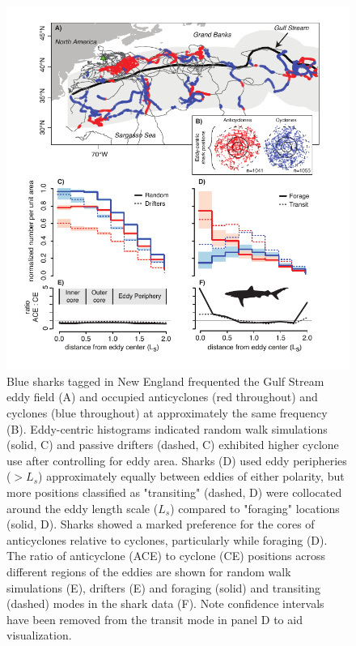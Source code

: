 \begin{figure}[htbp]
\centering
\includegraphics{images/C5_Fig1.pdf}
\caption[Use of Gulf Stream eddies by satellite-tagged blue sharks]{Blue sharks tagged in New England frequented the Gulf Stream eddy field (A) and occupied anticyclones (red throughout) and cyclones (blue throughout) at approximately the same frequency (B). Eddy-centric histograms indicated random walk simulations (solid, C) and passive drifters (dashed, C) exhibited higher cyclone use after controlling for eddy area. Sharks (D) used eddy peripheries ($>L_s$) approximately equally between eddies of either polarity, but more positions classified as "transiting" (dashed, D) were collocated around the eddy length scale ($L_s$) compared to "foraging" locations (solid, D). Sharks showed a marked preference for the cores of anticyclones relative to cyclones, particularly while foraging (D). The ratio of anticyclone (ACE) to cyclone (CE) positions across different regions of the eddies are shown for random walk simulations (E), drifters (E) and foraging (solid) and transiting (dashed) modes in the shark data (F). Note confidence intervals have been removed from the transit mode in panel D to aid visualization.}
\label{fig:c5f1}
\end{figure}

